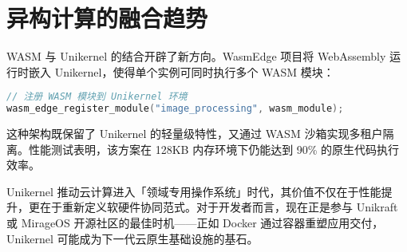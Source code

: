 \section{异构计算的融合趋势}
WASM 与 Unikernel 的结合开辟了新方向。WasmEdge 项目将 WebAssembly 运行时嵌入 Unikernel，使得单个实例可同时执行多个 WASM 模块：\par
\begin{lstlisting}[language=c]
// 注册 WASM 模块到 Unikernel 环境
wasm_edge_register_module("image_processing", wasm_module);
\end{lstlisting}
这种架构既保留了 Unikernel 的轻量级特性，又通过 WASM 沙箱实现多租户隔离。性能测试表明，该方案在 128KB 内存环境下仍能达到 90\%{} 的原生代码执行效率。\par
Unikernel 推动云计算进入「领域专用操作系统」时代，其价值不仅在于性能提升，更在于重新定义软硬件协同范式。对于开发者而言，现在正是参与 Unikraft 或 MirageOS 开源社区的最佳时机——正如 Docker 通过容器重塑应用交付，Unikernel 可能成为下一代云原生基础设施的基石。\par
